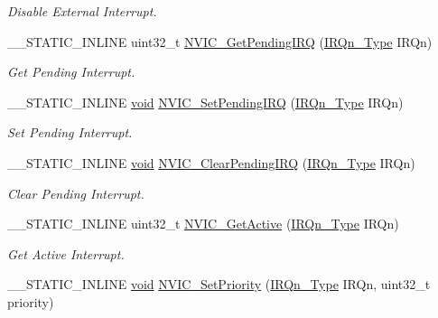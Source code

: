 \begin{DoxyCompactItemize}
\begin{DoxyCompactList}\small\item\em Disable External Interrupt. \end{DoxyCompactList}\item 
\-\_\-\-\_\-\-S\-T\-A\-T\-I\-C\-\_\-\-I\-N\-L\-I\-N\-E uint32\-\_\-t \hyperlink{group__CMSIS__Core__NVICFunctions_gafec8042db64c0f8ed432b6c8386a05d8}{N\-V\-I\-C\-\_\-\-Get\-Pending\-I\-R\-Q} (\hyperlink{group__CMSIS__175X__6X__IRQ_gaaaeafe7bd8401a46d55e8431b6326116}{I\-R\-Qn\-\_\-\-Type} I\-R\-Qn)
\begin{DoxyCompactList}\small\item\em Get Pending Interrupt. \end{DoxyCompactList}\item 
\-\_\-\-\_\-\-S\-T\-A\-T\-I\-C\-\_\-\-I\-N\-L\-I\-N\-E \hyperlink{Paradigm_2Tern__EE_2small_2portmacro_8h_a14d32f8130d3c0b212cfc751730b5b49}{void} \hyperlink{group__CMSIS__Core__NVICFunctions_ga3ecf446519da33e1690deffbf5be505f}{N\-V\-I\-C\-\_\-\-Set\-Pending\-I\-R\-Q} (\hyperlink{group__CMSIS__175X__6X__IRQ_gaaaeafe7bd8401a46d55e8431b6326116}{I\-R\-Qn\-\_\-\-Type} I\-R\-Qn)
\begin{DoxyCompactList}\small\item\em Set Pending Interrupt. \end{DoxyCompactList}\item 
\-\_\-\-\_\-\-S\-T\-A\-T\-I\-C\-\_\-\-I\-N\-L\-I\-N\-E \hyperlink{Paradigm_2Tern__EE_2small_2portmacro_8h_a14d32f8130d3c0b212cfc751730b5b49}{void} \hyperlink{group__CMSIS__Core__NVICFunctions_ga332e10ef9605dc6eb10b9e14511930f8}{N\-V\-I\-C\-\_\-\-Clear\-Pending\-I\-R\-Q} (\hyperlink{group__CMSIS__175X__6X__IRQ_gaaaeafe7bd8401a46d55e8431b6326116}{I\-R\-Qn\-\_\-\-Type} I\-R\-Qn)
\begin{DoxyCompactList}\small\item\em Clear Pending Interrupt. \end{DoxyCompactList}\item 
\-\_\-\-\_\-\-S\-T\-A\-T\-I\-C\-\_\-\-I\-N\-L\-I\-N\-E uint32\-\_\-t \hyperlink{group__CMSIS__Core__NVICFunctions_ga47a0f52794068d076c9147aa3cb8d8a6}{N\-V\-I\-C\-\_\-\-Get\-Active} (\hyperlink{group__CMSIS__175X__6X__IRQ_gaaaeafe7bd8401a46d55e8431b6326116}{I\-R\-Qn\-\_\-\-Type} I\-R\-Qn)
\begin{DoxyCompactList}\small\item\em Get Active Interrupt. \end{DoxyCompactList}\item 
\-\_\-\-\_\-\-S\-T\-A\-T\-I\-C\-\_\-\-I\-N\-L\-I\-N\-E \hyperlink{Paradigm_2Tern__EE_2small_2portmacro_8h_a14d32f8130d3c0b212cfc751730b5b49}{void} \hyperlink{group__CMSIS__Core__NVICFunctions_ga2305cbd44aaad792e3a4e538bdaf14f9}{N\-V\-I\-C\-\_\-\-Set\-Priority} (\hyperlink{group__CMSIS__175X__6X__IRQ_gaaaeafe7bd8401a46d55e8431b6326116}{I\-R\-Qn\-\_\-\-Type} I\-R\-Qn, uint32\-\_\-t priority)

\end{DoxyCompactItemize}
